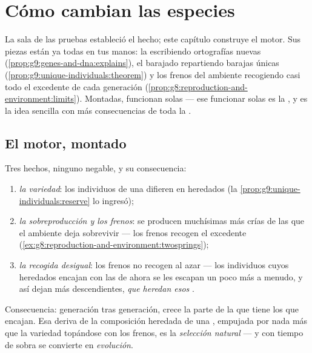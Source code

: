 \chapter{Cómo cambian las especies}\label{ch:g9:how-species-change}

La sala de las pruebas estableció el hecho; este capítulo construye el
motor. Sus piezas están ya todas en tus manos: la  escribiendo
ortografías nuevas (\cref{prop:g9:genes-and-dna:explains}), el barajado
repartiendo barajas únicas
(\cref{prop:g9:unique-individuals:theorem}) y los frenos del ambiente
recogiendo casi todo el excedente de cada generación
(\cref{prop:g8:reproduction-and-environment:limits}). Montadas,
funcionan solas --- ese funcionar solas es la , y es
la idea sencilla con más consecuencias de toda la .

\section{El motor, montado}

\begin{proposition}\label{prop:g9:how-species-change:selection}
Tres hechos, ninguno negable, y su consecuencia:
\begin{enumerate}
  \item \emph{la variedad}: los individuos de una  difieren en
         heredados (la
        \cref{prop:g9:unique-individuals:reserve} lo ingresó);
  \item \emph{la sobreproducción y los frenos}: se producen muchísimas
        más crías de las que el ambiente deja sobrevivir --- los frenos
        recogen el excedente
        (\cref{ex:g8:reproduction-and-environment:twosprings});
  \item \emph{la recogida desigual}: los frenos no recogen al azar ---
        los individuos cuyos  heredados encajan con las
         de ahora se les escapan un poco más a menudo, y así
        dejan más descendientes, \emph{que heredan esos }.
\end{enumerate}
Consecuencia: generación tras generación, crece la parte de la
 que tiene los  que encajan. Esa deriva de la
composición heredada de una , empujada por nada más que la
variedad topándose con los frenos, es la \emph{selección
natural} --- y con tiempo de sobra se
convierte en \emph{evolución}.
\end{proposition}
\admitted


